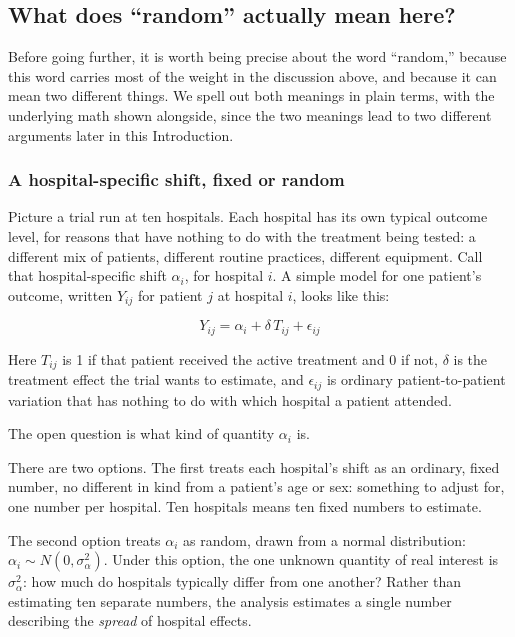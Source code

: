 \documentclass[
  11pt,
]{article}
\begin{document}
\subsection{What does ``random'' actually mean here?}\label{what-does-random-actually-mean-here}

Before going further, it is worth being precise about the
word ``random,'' because this word carries most of the weight
in the discussion above, and because it can mean two
different things. We spell out both meanings in plain terms,
with the underlying math shown alongside, since the two
meanings lead to two different arguments later in this
Introduction.

\subsubsection{A hospital-specific shift, fixed or random}\label{a-hospital-specific-shift-fixed-or-random}

Picture a trial run at ten hospitals. Each hospital has its
own typical outcome level, for reasons that have nothing to
do with the treatment being tested: a different mix of
patients, different routine practices, different equipment.
Call that hospital-specific shift \(\alpha_i\), for hospital
\(i\). A simple model for one patient's outcome, written
\(Y_{ij}\) for patient \(j\) at hospital \(i\), looks like this:

\[Y_{ij} = \alpha_i + \delta \, T_{ij} + \epsilon_{ij}\]

Here \(T_{ij}\) is 1 if that patient received the active
treatment and 0 if not, \(\delta\) is the treatment effect the
trial wants to estimate, and \(\epsilon_{ij}\) is ordinary
patient-to-patient variation that has nothing to do with
which hospital a patient attended.

The open question is what kind of quantity \(\alpha_i\) is.

There are two options. The first treats each hospital's
shift as an ordinary, fixed number, no different in kind
from a patient's age or sex: something to adjust for, one
number per hospital. Ten hospitals means ten fixed numbers
to estimate.

The second option treats \(\alpha_i\) as random, drawn from a
normal distribution: \(\alpha_i \sim N(0, \sigma^2_\alpha)\).
Under this option, the one unknown quantity of real interest
is \(\sigma^2_\alpha\): how much do hospitals typically differ
from one another? Rather than estimating ten separate
numbers, the analysis estimates a single number describing
the \emph{spread} of hospital effects.
\end{document}
